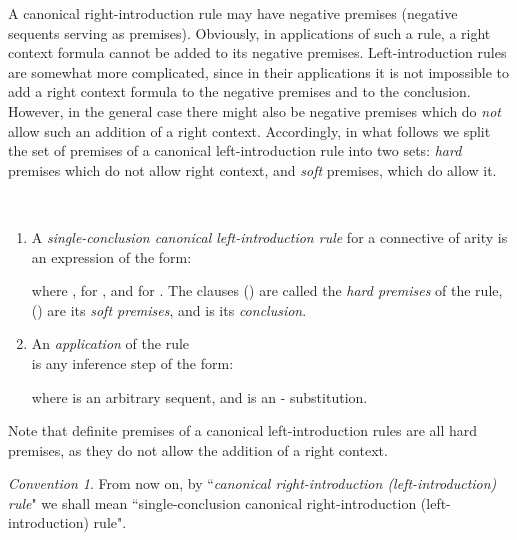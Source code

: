 \documentclass{LMCS}
\theoremstyle{remark}
\newtheorem*{convention}{Convention}
\newcommand{\be}{\begin{enumerate}[(1)]}
\newcommand{\ee}{\end{enumerate}}
\begin{document}
A canonical right-introduction rule may have negative premises 
(negative sequents serving as premises).
Obviously, in applications of such a rule, a right 
context formula cannot be added
to its negative premises. Left-introduction rules are somewhat more complicated, since
in their applications it is not impossible to add a right context formula to 
the negative premises and to the conclusion. However,
in the general case there might also be negative premises 
which do {\em not} allow such an  addition of  a right context.
Accordingly, in what follows we split the set of premises
of a canonical left-introduction rule into two sets: {\em hard} premises 
which do not allow right context, 
and {\em soft} premises, which do allow it.


\sloppy

\begin{defi}
\label{canonical left-introduction rule}
\
\be
\item
A {\em  single-conclusion canonical left-introduction rule} for a connective  of arity 
is an expression of the form:
\begin{center}

\end{center}
where ,  for , 
and   for . The clauses
 () are called the {\em hard premises}
of the rule, 
  ()  are its {\em soft premises}, 
and  is its {\em conclusion}.
\item An {\em application} of the rule
\\ 
is any inference step of the form:

where  is an arbitrary sequent, and  is an - substitution.
\ee
\end{defi}

\fussy

\begin{rem}
Note that definite premises of a canonical left-introduction rules 
are all hard premises, as they do not allow the addition of a right context.
\end{rem}

\begin{convention}
From now on, by  ``{\em canonical right-introduction (left-introduction) rule}" 
we shall mean ``single-conclusion canonical right-introduction (left-introduction) rule".
\end{convention}
\end{document}
